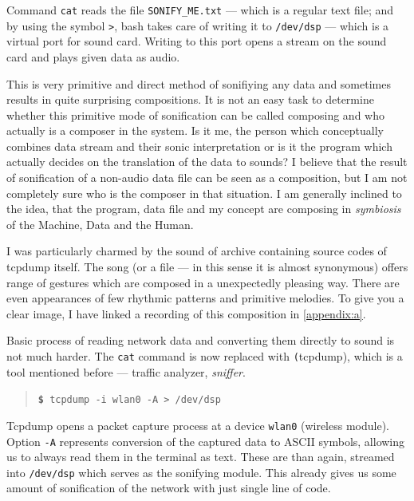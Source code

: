 \documentclass[12pt,a4paper,oneside]{report}
\begin{document}
Command \texttt{cat} reads the file \texttt{SONIFY\_ME.txt} --- which is a regular text file; and by using the symbol \texttt{>}, bash takes care of writing it to \texttt{/dev/dsp} --- which is a virtual port for sound card. Writing to this port opens a stream on the sound card and plays given data as audio.

This is very primitive and direct method of sonifiying any data and sometimes results in quite surprising compositions. It is not an easy task to determine whether this primitive mode of sonification can be called composing and who actually is a composer in the system. Is it me, the person which conceptually combines data stream and their sonic interpretation or is it the program which actually decides on the translation of the data to sounds? I believe that the result of sonification of a non-audio data file can be seen as a composition, but I am not completely sure who is the composer in that situation. I am generally inclined to the idea, that the program, data file and my concept are composing in \emph{symbiosis} of the Machine, Data and the Human.

I was particularly charmed by the sound of archive containing source codes of tcpdump itself. The song (or a file --- in this sense it is almost synonymous) offers range of gestures which are composed in a unexpectedly pleasing way. There are even appearances of few rhythmic patterns and primitive melodies. To give you a clear image, I have linked a recording of this composition in \autoref{appendix:a}.

Basic process of reading network data and converting them directly to sound is not much harder. The \texttt{cat} command is now replaced with \texttt(tcpdump), which is a tool mentioned before --- traffic analyzer, \emph{sniffer}.
\begin{quotation}
	\texttt{\textbf{\$} tcpdump -i wlan0 -A > /dev/dsp} 
\end{quotation}

Tcpdump opens a packet capture process at a device \texttt{wlan0} (wireless module). Option \texttt{-A} represents conversion of the captured data to ASCII symbols, allowing us to always read them in the terminal as text. These are than again, streamed into \texttt{/dev/dsp} which serves as the sonifying module. This already gives us some amount of sonification of the network with just single line of code. 
\end{document}

